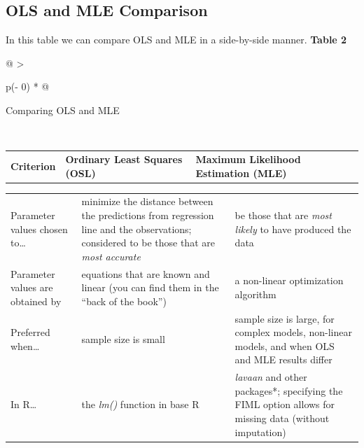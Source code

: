 \documentclass[
  11pt,
]{book}
\begin{document}
\hypertarget{ols-and-mle-comparison}{%
\subsection{OLS and MLE Comparison}\label{ols-and-mle-comparison}}

In this table we can compare OLS and MLE in a side-by-side manner. \textbf{Table 2}

\begin{longtable}[]{@{}
  >{\raggedright\arraybackslash}p{(\columnwidth - 0\tabcolsep) * }@{}}
\toprule\noalign{}
\begin{minipage}[b]{\linewidth}\raggedright
Comparing OLS and MLE \citep{cohen_applied_2003, myung_tutorial_2003}
\end{minipage} \\
\midrule\noalign{}
\endhead
\bottomrule\noalign{}
\endlastfoot
\end{longtable}

\begin{longtable}[]{@{}
  >{\centering\arraybackslash}p{}
  >{\centering\arraybackslash}p{}
  >{\centering\arraybackslash}p{}@{}}
\toprule\noalign{}
\endhead
\bottomrule\noalign{}
\endlastfoot
\textbf{Criterion} & \textbf{Ordinary Least Squares (OSL)} & \textbf{Maximum Likelihood Estimation (MLE)} \\
\end{longtable}

\begin{longtable}[]{@{}
  >{\centering\arraybackslash}p{}
  >{\centering\arraybackslash}p{}
  >{\centering\arraybackslash}p{}@{}}
\toprule\noalign{}
\endhead
\bottomrule\noalign{}
\endlastfoot
Parameter values chosen to\ldots{} & minimize the distance between the predictions from regression line and the observations; considered to be those that are \emph{most accurate} & be those that are \emph{most likely} to have produced the data \\
Parameter values are obtained by & equations that are known and linear (you can find them in the ``back of the book'') & a non-linear optimization algorithm \\
Preferred when\ldots{} & sample size is small & sample size is large, for complex models, non-linear models, and when OLS and MLE results differ \\
In R\ldots{} & the \emph{lm()} function in base R & \emph{lavaan} and other packages*; specifying the FIML option allows for missing data (without imputation) \\
\end{longtable}
\end{document}
